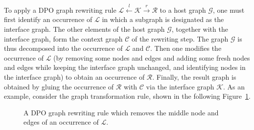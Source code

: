 To apply a DPO graph rewriting rule $\mathcal{L} \overset{l}{\leftarrow} \mathcal{K} \overset{r}{\rightarrow} \mathcal{R}$ to a host graph $\mathcal{G}$, one must first identify an occurrence of $\mathcal{L}$ in which a subgraph is designated as the interface graph. The other elements of the host graph $\mathcal{G}$, together with the interface graph, form the context graph $\mathcal{C}$ of the rewriting step.
The graph $\mathcal{G}$ is thus decomposed into the occurrence of $\mathcal{L}$ and $\mathcal{C}$. 
Then one modifies the occurrence of $\mathcal{L}$ (by removing some nodes and edges and adding some fresh nodes and edges while keeping the interface graph unchanged, and identifying nodes in the interface graph)
to obtain an occurrence of $\mathcal{R}$. Finally, the result graph is obtained by gluing the occurrence of $\mathcal{R}$ with $\mathcal{C}$ via the interface graph $\mathcal{K}$.
As an example, 
consider the graph transformation rule, shown in the following Figure~\ref{fig:intro:graph_transformation_rule_dpo_sssssfggaaadww}.
  \begin{figure}[H]
    \centering
    \caption{A DPO graph rewriting rule which removes the middle node and edges of an occurrence of $\mathcal{L}$.}
    \label{fig:intro:graph_transformation_rule_dpo_sssssfggaaadww}
\end{figure}
